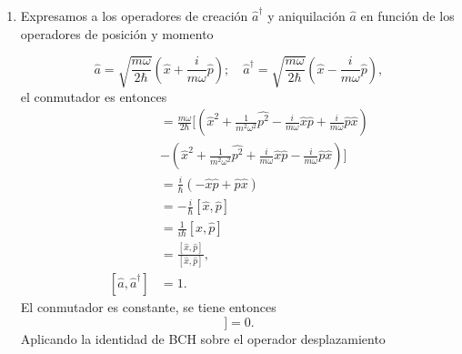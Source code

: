 \setcounter{equation}{0}

\begin{enumerate}
  \item Expresamos a los operadores de creación $\hat{a}^\dagger$ y aniquilación $\hat{a}$ en función de los operadores de posición y momento

        \begin{equation}
          \hat{a} = \sqrt{\frac{m\omega}{2\hbar}}\left( \hat{x} + \frac{i}{m\omega}\hat{p} \right); \quad \hat{a}^\dagger = \sqrt{\frac{m\omega}{2\hbar}}\left( \hat{x} - \frac{i}{m\omega}\hat{p} \right),
        \end{equation}
        el conmutador es entonces
        \begin{align}
          [\hat{a}, \hat{a}^\dagger] & = \frac{m\omega}{2\hbar} \Bigg[ \left( \hat{x}^2 + \frac{1}{m^2\omega^2}\hat{p^2} - \frac{i}{m\omega}\hat{x}\hat{p} + \frac{i}{m\omega}\hat{p}\hat{x} \right) \\ &- \left( \hat{x}^2 + \frac{1}{m^2\omega^2}\hat{p^2} + \frac{i}{m\omega}\hat{x}\hat{p} - \frac{i}{m\omega}\hat{p}\hat{x} \right) \Bigg] \nonumber \\
                                     & = \frac{i}{\hbar}\left(-\hat{x}\hat{p} + \hat{p}\hat{x}\right) \nonumber                                                                                      \\
                                     & = -\frac{i}{\hbar}[\hat{x}, \hat{p}] \nonumber                                                                                                                \\
                                     & = \frac{1}{i\hbar}[\hat{x}, \hat{p}] \nonumber                                                                                                                \\
                                     & = \frac{[\hat{x}, \hat{p}]}{[\hat{x}, \hat{p}]},  \nonumber                                                                                                   \\
          [\hat{a}, \hat{a}^\dagger] & = 1.
        \end{align}
        El conmutador es constante, se tiene entonces
        \begin{equation}
          [\hat{A}, [\hat{a}, \hat{a}^{\dagger}]] = 0.
        \end{equation}
        Aplicando la identidad de BCH sobre el operador desplazamiento
        \begin{align}

\end{align}
\end{enumerate}
